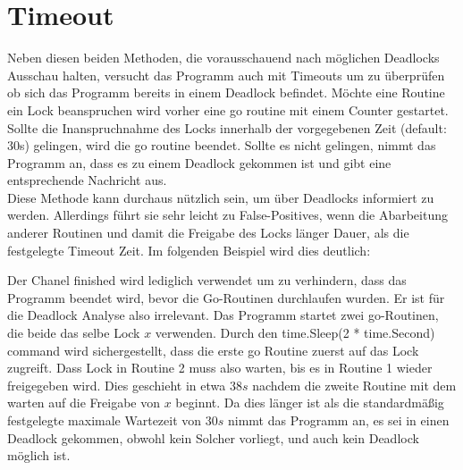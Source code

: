 \section{Timeout}
Neben diesen beiden Methoden, die vorausschauend nach möglichen Deadlocks 
Ausschau halten, versucht das Programm auch mit Timeouts um zu überprüfen ob 
sich das Programm bereits in einem Deadlock befindet. Möchte eine Routine ein 
Lock beanspruchen wird vorher eine go routine mit einem Counter gestartet.
Sollte die Inanspruchnahme des Locks innerhalb der vorgegebenen Zeit 
(default: 30s) gelingen, wird die go routine beendet. Sollte es nicht gelingen,
nimmt das Programm an, dass es zu einem Deadlock 
gekommen ist und gibt eine entsprechende Nachricht aus.\\
Diese Methode kann
durchaus nützlich sein, um über Deadlocks informiert zu werden. Allerdings führt
sie sehr leicht zu False-Positives, wenn die Abarbeitung anderer Routinen und 
damit die Freigabe des Locks länger Dauer, als die festgelegte Timeout Zeit.
Im folgenden Beispiel wird dies deutlich:
\begin{figure}[H]
    
\end{figure}
Der Chanel finished wird lediglich verwendet um zu verhindern, dass das Programm 
beendet wird, bevor die Go-Routinen durchlaufen wurden. Er ist für die Deadlock
Analyse also irrelevant. Das Programm startet zwei go-Routinen, die beide das 
selbe Lock $x$ verwenden. Durch den time.Sleep(2 * time.Second) command wird 
sichergestellt, dass die erste go Routine zuerst auf das Lock zugreift. 
Dass Lock in Routine 2 muss also warten, bis es in Routine 1 wieder freigegeben
wird. Dies geschieht in etwa $38 s$ nachdem die zweite Routine mit dem warten 
auf die Freigabe von $x$ beginnt. Da dies länger ist als die standardmäßig
festgelegte maximale Wartezeit von $30 s$ nimmt das Programm an, es sei in einen 
Deadlock gekommen, obwohl kein Solcher vorliegt, und auch kein Deadlock möglich 
ist.

